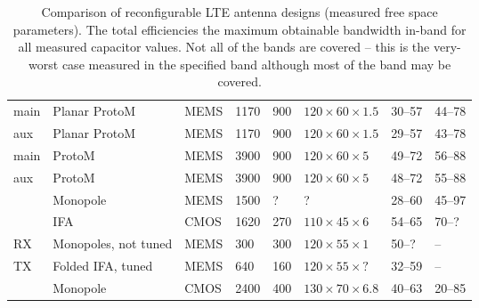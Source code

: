 \begin{table}[htbp]
\begin{tabularx}{\linewidth}{p{24mm}Xk{13mm}k{17mm}k{13mm}k{20mm}k{17mm}k{17mm}}
        \midrule
        \cite{ilvonen2014multiband} main     & Planar ProtoM               & MEMS     & 1170   & 900   & $120\times60\times1.5$   & 30--57 & 44–78         \\
        \cite{ilvonen2014multiband} aux      & Planar ProtoM               & MEMS     & 1170   & 900   & $120\times60\times1.5$   & 29--57 & 43--78        \\
        \cite{ilvonen2014multiband} main     & ProtoM                      & MEMS     & 3900   & 900   & $120\times60\times5$     & 49--72 & 56--88        \\
        \cite{ilvonen2014multiband} aux      & ProtoM                      & MEMS     & 3900   & 900   & $120\times60\times5$     & 48--72 & 55--88        \\
        \cite{morris2014tunable}             & Monopole                    & MEMS     & 1500   & ?     & ?                        & 28--60 & 45--97        \\
        \cite{xia2015compact}                & IFA                         & CMOS     & 1620   & 270   & $110\times45\times6$     & 54--65 & 70--?         \\
        \cite{tatomirescu2015alternative} RX & Monopoles, not tuned        & MEMS     & 300    & 300   & $120\times55\times1$     & 50--?  & --            \\
        \cite{tatomirescu2015alternative} TX & Folded IFA, tuned           & MEMS     & 640    & 160   & $120\times55\times?$     & 32--59 & --            \\
        \cite{trinh2016reconfigurable}       & Monopole                    & CMOS     & 2400   & 400   & $130\times70\times6.8$   & 40--63 & 20--85        \\
        \bottomrule
    \end{tabularx}
    \caption{Comparison of reconfigurable LTE antenna designs (measured free space parameters). The total efficiencies the maximum obtainable bandwidth in-band for all measured capacitor values. \MARK{}Not all of the bands are covered -- this is the very-worst case measured in the specified band although most of the band may be covered.}
    \label{tab:comparison_reconf_lte}
\end{table}

% 
% 
% 
